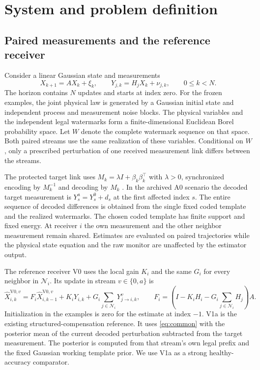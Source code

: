 \section{System and problem definition}
\label{sec:model}

\subsection{Paired measurements and the reference receiver}

Consider a linear Gaussian state and measurements
\begin{equation}
 X_{k+1}=A X_k+\xi_k,\qquad Y_{j,k}=H_jX_k+\nu_{j,k},\qquad 0\le k<N .
 \label{eq:plant}
\end{equation}
The horizon contains \(N\) updates and starts at index zero. For the frozen examples, the joint physical law is generated by a Gaussian initial state and independent process and measurement noise blocks. The physical variables and the independent legal watermarks form a finite-dimensional Euclidean Borel probability space. Let \(W\) denote the complete watermark sequence on that space. Both paired streams use the same realization of these variables. Conditional on \(W\), only a prescribed perturbation of one received measurement link differs between the streams.

The protected target link uses \(M_k=\lambda I+\beta_k\beta_k^\top\) with \(\lambda>0\), synchronized encoding by \(M_k^{-1}\) and decoding by \(M_k\) \cite{zhou}. In the archived A0 scenario the decoded target measurement is \(Y_s^a=Y_s^0+d_s\) at the first affected index \(s\). The entire sequence of decoded differences is obtained from the single fixed coded template and the realized watermarks. The chosen coded template has finite support and fixed energy. At receiver \(i\) the own measurement and the other neighbor measurement remain shared. Estimates are evaluated on paired trajectories while the physical state equation and the raw monitor are unaffected by the estimator output.

The reference receiver V0 uses the local gain \(K_i\) and the same \(G_i\) for every neighbor in \(\mathcal N_i\). Its update in stream \(v\in\{0,a\}\) is
\begin{equation}
 \widehat X^{\mathrm{V0},v}_{i,k}
   = F_i\widehat X^{\mathrm{V0},v}_{i,k-1}
      +K_iY_{i,k}+G_i\sum_{j\in\mathcal N_i}Y^v_{j\to i,k},
 \qquad F_i=\left(I-K_iH_i-G_i\sum_{j\in\mathcal N_i}H_j\right)A .
 \label{eq:common}
\end{equation}
Initialization in the examples is zero for the estimate at index \(-1\). V1a is the existing structured-compensation reference. It uses \eqref{eq:common} with the posterior mean of the current decoded perturbation subtracted from the target measurement. The posterior is computed from that stream's own legal prefix and the fixed Gaussian working template prior. We use V1a as a strong healthy-accuracy comparator.

